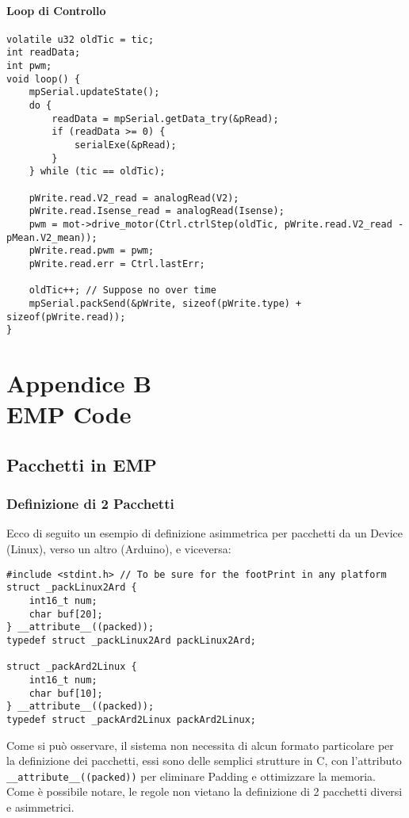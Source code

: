 \subsubsection{Loop di Controllo}
\begin{lstlisting}[style=cppStyle,caption={Loop di Controllo},label=lst:controlLoop] 
volatile u32 oldTic = tic;
int readData;
int pwm;
void loop() {
	mpSerial.updateState();
	do {
		readData = mpSerial.getData_try(&pRead);
		if (readData >= 0) {
			serialExe(&pRead);
		}
	} while (tic == oldTic);
	
	pWrite.read.V2_read = analogRead(V2);
	pWrite.read.Isense_read = analogRead(Isense);
	pwm = mot->drive_motor(Ctrl.ctrlStep(oldTic, pWrite.read.V2_read - pMean.V2_mean));
	pWrite.read.pwm = pwm;
	pWrite.read.err = Ctrl.lastErr;
	
	oldTic++; // Suppose no over time
	mpSerial.packSend(&pWrite, sizeof(pWrite.type) + sizeof(pWrite.read));
}
\end{lstlisting}

\chapter*{Appendice B\\ EMP Code}\label{EMPCode}
\setcounter{chapter}{\thechapter + 1}

\section{Pacchetti in EMP}
\subsection{Definizione di 2 Pacchetti}
Ecco di seguito un esempio di definizione asimmetrica per pacchetti da un Device (Linux), verso un altro (Arduino), e viceversa:\\
\begin{lstlisting}[style=cppStyle,caption={esempio di definizione Pacchetto in EMP},label=lst:EMPpackDef] 
#include <stdint.h>	// To be sure for the footPrint in any platform
struct _packLinux2Ard {
	int16_t num;
	char buf[20];
} __attribute__((packed));
typedef struct _packLinux2Ard packLinux2Ard;

struct _packArd2Linux {
	int16_t num;
	char buf[10];
} __attribute__((packed));
typedef struct _packArd2Linux packArd2Linux;
\end{lstlisting}
\noindent
Come si può osservare, il sistema non necessita di alcun formato particolare per la definizione dei pacchetti, essi sono delle semplici strutture in C, con l'attributo \verb|__attribute__((packed))| per eliminare Padding e ottimizzare la memoria.
Come è possibile notare, le regole non vietano la definizione di 2 pacchetti diversi e asimmetrici.
\newpage

